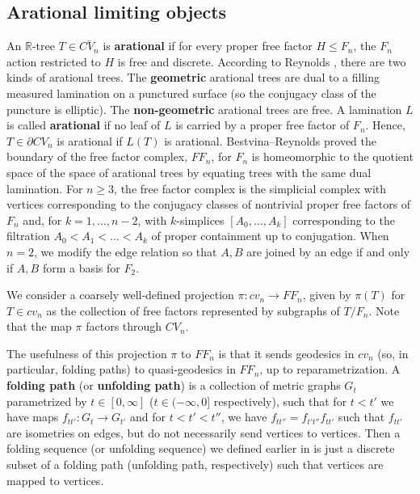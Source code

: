 \documentclass[11pt, letterpaper]{amsart}
\theoremstyle{plain}
\theoremstyle{definition}
\newcommand{\R}{\mathbb{R}}
\newcommand{\ov}[1]{\overline{#1}}
\begin{document}
\subsection{Arational limiting objects}
\label{ssec:arationalprelim}

An $\R$-tree $T \in \ov{CV_n}$ is \textbf{arational} if for every proper free factor $H \le F_n$,
the $F_n$ action restricted to $H$ is free and discrete. According to Reynolds
\cite[Theorem 1.1]{reynolds2012reducing}, there are two kinds of arational
trees. The \textbf{geometric} arational trees are dual to a filling measured
lamination on a punctured surface (so the conjugacy class of the puncture is
elliptic). The \textbf{non-geometric} arational trees are free. A lamination $L$
is called \textbf{arational} if no leaf of $L$ is carried by a proper free
factor of $F_n$. Hence, $T \in \partial CV_n$ is arational if $L(T)$ is
arational. Bestvina--Reynolds \cite[Theorem 1.1]{bestvina2015boundary} proved
the boundary of the free factor complex, $FF_n$, 
for $F_n$ is homeomorphic to the quotient
space of the space of
arational trees by equating trees with the same dual lamination.
For $n \ge 3$, the free factor complex is the simplicial complex with vertices corresponding to
the conjugacy classes of nontrivial proper free factors of $F_n$ and, for $k=1,\ldots,n-2$, with
$k$-simplices $[A_0,\ldots,A_k]$ corresponding to the filtration $A_0 < A_1
<\ldots <A_k$ of proper containment up to conjugation. When $n=2$, we modify the
edge relation so that $A,B$ are joined by an edge if and only if $A,B$ form a
basis for $F_2$.


We consider a coarsely well-defined projection $\pi : cv_n \to FF_n$, given by
$\pi(T)$ for $T \in cv_n$ as the collection of free factors represented by
subgraphs of $T/F_n$. Note that the map $\pi$ factors through $CV_n$.



The usefulness of this projection $\pi$ to $FF_n$ is that
it sends geodesics in $cv_n$ (so, in particular, folding paths) to
quasi-geodesics in $FF_n$, up to reparametrization.
A \textbf{folding path} (or \textbf{unfolding path}) is a collection of metric graphs $G_t$
parametrized by $t \in [0,\infty]$ ($t \in (-\infty, 0]$ respectively), such that
for $t<t'$ we have maps $f_{tt'}:G_t\to G_{t'}$ and for $t<t'<t''$, we have 
$f_{tt''}=f_{t't''}f_{tt'}$ such that $f_{tt'}$ are isometries on edges,
but do not necessarily send vertices to vertices. Then a folding sequence (or
unfolding sequence) we defined earlier in  is just a discrete subset of a folding path (unfolding path,
respectively) such that vertices are mapped to vertices.
\end{document}
